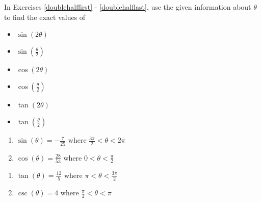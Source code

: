 \documentclass{ximera}
\begin{document}
In Exercises \ref{doublehalffirst} - \ref{doublehalflast}, use the given information about $\theta$ to find the exact values of 

\begin{multicols}{3}

\begin{itemize}

\item $\sin(2\theta)$
\item $\sin\left(\frac{\theta}{2}\right)$
\item $\cos(2\theta)$
\item $\cos\left(\frac{\theta}{2}\right)$
\item $\tan(2\theta)$
\item $\tan\left(\frac{\theta}{2}\right)$

\end{itemize}

\end{multicols}

\begin{multicols}{2}

\begin{enumerate}

\setcounter{enumi}{\value{HW}}

\item $\sin(\theta) = -\frac{7}{25}$ where $\frac{3\pi}{2} < \theta < 2\pi$ \label{doublehalffirst}
\item $\cos(\theta) = \frac{28}{53}$ where $0 < \theta < \frac{\pi}{2}$

\setcounter{HW}{\value{enumi}}

\end{enumerate}

\end{multicols}

\begin{multicols}{2}

\begin{enumerate}

\setcounter{enumi}{\value{HW}}

\item $\tan(\theta) = \frac{12}{5}$ where $\pi < \theta < \frac{3\pi}{2}$
\item $\csc(\theta) = 4$ where $\frac{\pi}{2} < \theta < \pi$

\setcounter{HW}{\value{enumi}}

\end{enumerate}

\end{multicols}
\end{document}

